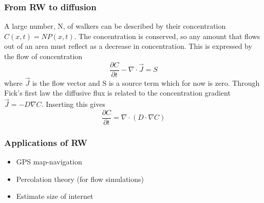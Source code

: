 \documentclass{beamer}
\renewcommand{\d}{\partial}
\begin{document}
\begin{frame}
\frametitle{From RW to diffusion}
A large number, N, of walkers can be described by their concentration $C(x,t) = NP(x,t)$.
The concentration is conserved, so any amount that flows out of an area must reflect as a decrease in concentration. 
This is expressed by the flow of concentration
\begin{equation}
 \frac{\d C}{\d t} -\nabla\cdot\vec{J} = S
\end{equation}
where $\vec{J}$ is the flow vector and S is a source term which for now is zero.
Through Fick's first law the diffusive flux is related to the concentration gradient $\vec{J} = -D\nabla C$. 
Inserting this gives
\begin{equation}\label{simple_diffusion_equation}
 \frac{\d C}{\d t} = \nabla\cdot \left(D\cdot\nabla C\right)
\end{equation}
\end{frame}

\begin{frame}
\frametitle{Applications of RW}
\begin{itemize}
 \item GPS map-navigation
 \item Percolation theory (for flow simulations)
 \item Estimate size of internet
\end{itemize}

\end{frame}
\end{document}
